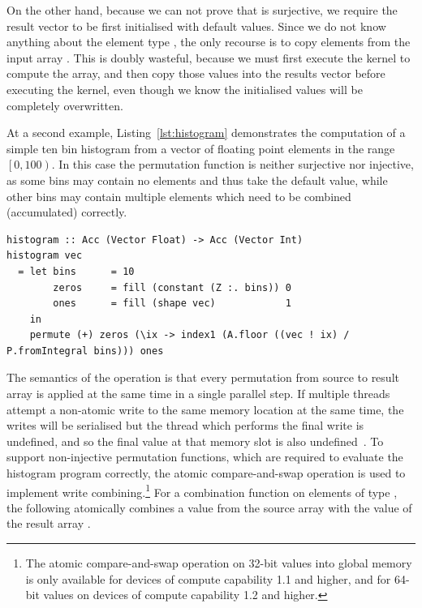 On the other hand, because we can not prove that  is surjective, we
require the result vector to be first initialised with default values. Since we
do not know anything about the element type , the only recourse is to
copy elements from the input array . This is doubly wasteful, because
we must first execute the  kernel to compute the
 array, and then copy those values into the results vector before
executing the  kernel, even though we know the initialised values
will be completely overwritten.

At a second example, Listing~\ref{lst:histogram} demonstrates the computation of
a simple ten bin histogram from a vector of floating point elements in the range
$\left[ 0, 100 \right)$. In this case the permutation function is neither
surjective nor injective, as some bins may contain no elements and thus take the
default value, while other bins may contain multiple elements which need to be
combined (accumulated) correctly.
%
\begin{lstlisting}[style=haskell
    ,label=lst:histogram
    ,caption={[Simple histogram in Accelerate] A simple histogram written in
    Accelerate. We assume the input vector contains elements in the range
    $\left[0,100\right)$ and accumulate into ten equally sized bins.}]
histogram :: Acc (Vector Float) -> Acc (Vector Int)
histogram vec
  = let bins      = 10
        zeros     = fill (constant (Z :. bins)) 0
        ones      = fill (shape vec)            1
    in
    permute (+) zeros (\ix -> index1 (A.floor ((vec ! ix) / P.fromIntegral bins))) ones
\end{lstlisting}

The semantics of the operation is that every permutation from source to result
array is applied at the same time in a single parallel step. If multiple \CUDA
threads attempt a non-atomic write to the same memory location at the same time,
the writes will be serialised but the thread which performs the final write is
undefined, and so the final value at that memory slot is also
undefined~\cite{NVIDIA:2012wf}. To support non-injective permutation functions,
which are required to evaluate the histogram program correctly, the atomic
compare-and-swap operation is used to implement write combining.\footnote{The
atomic compare-and-swap operation on 32-bit values into global memory is only
available for devices of compute capability 1.1 and higher, and for 64-bit
values on devices of compute capability 1.2 and higher.} For a combination
function  on elements of type , the following atomically
combines a value from the source array  with the value of the result
array .


